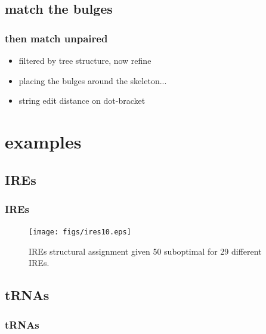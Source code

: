 \documentclass{beamer}
\begin{document}
\subsection{match the bulges}
\begin{frame}
	\frametitle{then match unpaired}
	\begin{figure}[!htb]
	\centering
	\resizebox{0.75\textwidth}{!}{}
	\end{figure}	
	\begin{itemize}
		\item filtered by tree structure, now refine
		\item placing the bulges around the skeleton...
		\item string edit distance on dot-bracket
	\end{itemize}
\end{frame}



\section{examples}
\subsection{IREs}
\begin{frame}
	\frametitle{IREs}
	\begin{figure}[!htb]
	\centering
	\texttt{[image: figs/ires10.eps]}
	\caption{IREs structural assignment given 50 suboptimal for 29 different IREs.}
	\end{figure} 
\end{frame}



\subsection{tRNAs}
\begin{frame}
	\frametitle{tRNAs}
	

\end{frame}
\end{document}
